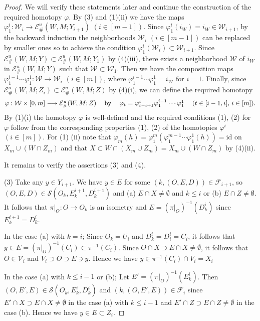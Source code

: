 \documentclass[11pt, fleqn]{amsart}
\theoremstyle{definition}
\newcommand{\cal}{\mathcal}
\renewcommand{\phi}{\varphi}
\newcommand{\lra}{\longrightarrow}
\newcommand{\id}{\mathrm{id}}
\newcommand{\E}{\mathcal E}
\newcommand{\W}{\mathcal W}
\begin{document}
\begin{proof}
We will verify these statements later and continue the construction of the required homotopy $\phi$. 
By (3) and (1)(ii) we have the maps $\phi^i_1 : \W_i \to \E^u_\#(W, M; Y_{i+1})$ $(i \in [m-1])$.
Since $\phi^i_1(i_W) = i_W \in \W_{i+1}$, 
by the backward induction the neighborhoods $\W_i$ $(i \in [m-1])$ can be replaced by smaller ones 
so to achieve the condition $\phi^i_1(\W_i) \subset \W_{i+1}$. 
Since $\E^u_\#(W, M; Y) \subset \E^u_\#(W, M; Y_1)$ by (4)(iii), 
there exists a neighborhood $\W$ of $i_W$ in $\E^u_\#(W, M; Y)$ such that $\W \subset \W_1$. 
Then we have the composition maps $\phi^{i-1}_1 \cdots \phi^1_1 : \W \to \W_i$ $(i \in [m])$, 
where $\phi^{i-1}_1 \cdots \phi^1_1 = i_{\W}$ for $i=1$.  
Finally, since $\E^u_\#(W, M; Z_i) \subset \E^u_\#(W, M; Z)$ by (4)(i), 
we can define the required homotopy 
$$\mbox{$\phi  : \W \times [0,m] \lra \E^u_\#(W, M; Z)$ \hspace{2mm} by 
\hspace{2mm}  
$\phi_t = \phi^i_{t-i+1}\phi^{i-1}_1 \cdots \phi^1_1$ \hspace{2mm} $(t \in [i-1,i]$, $i \in [m])$.}$$  
By (1)(i) the homotopy $\phi$ is well-defined and the required conditions (1), (2) for $\phi$ follow from the corresponding properties (1), (2) of the homotopies $\phi^i$ $(i \in [m])$. 
For (1) (ii) note that $\phi_m(h) = \phi_1^m(\phi^{m-1}_1 \cdots \phi^1_1(h)) = \id$ on $X_m \cup (W \cap Z_m)$ and 
that $X \subset W \cap (X_m \cup Z_m) = X_m \cup (W \cap Z_m)$ by (4)(ii). 

It remains to verify the assertions (3) and (4). 

(3) Take any $y \in Y_{i+1}$. 
We have $y \in E$ for some $(k, (O,E,D)) \in {\cal F}_{i+1}$, so  
$(O,E,D) \in {\cal S}(O_k, E_k^{i+1}, D_k^{i+1})$ and 
 (a) $E \cap X \neq \emptyset$ and $k \leq i$ or (b) $E \cap Z \neq \emptyset$. 
 It follows that $\pi|_O : O \to O_k$ is an isometry and $E = (\pi|_O)^{-1}(D_k^i)$ since $E_k^{i+1} = D_k^i$. 

In the case (a) with $k = i$;  
Since $O_k = U_i$ and $D_k^i = D_i^i = C_i$, it follows that 
$y \in E = (\pi|_O)^{-1}(C_i) \subset \pi^{-1}(C_i)$. 
Since $O \cap X \supset E \cap X \neq \emptyset$, it follows that 
$O \in {\cal V}_i$ and $V_i \supset O \supset E \ni y$. 
Hence we have $y \in \pi^{-1}(C_i) \cap V_i = X_i$ 

In the case (a) with $k \leq i-1$ or (b); 
Let $E' = (\pi|_O)^{-1}(E_k^i)$. Then $(O, E', E) \in {\cal S}(O_k, E_k^i, D_k^i)$ and  
$(k, (O, E', E)) \in {\cal F}_i$ since $E' \cap X \supset E \cap X \neq \emptyset$ in the case (a) with $k \leq i-1$ and 
$E' \cap Z \supset E \cap Z \neq \emptyset$ in the case (b). 
Hence we have $y \in E \subset Z_i$.  


\end{proof}
\end{document}
